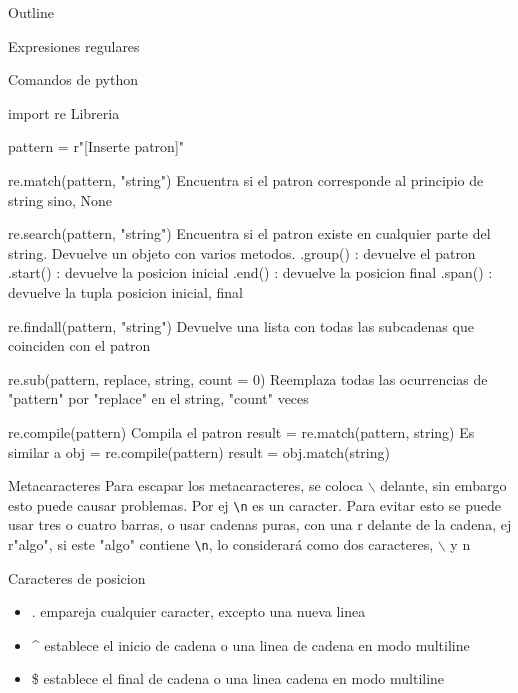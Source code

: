 \documentclass[presentation]{beamer}
\author{guillermo}
\date{\today}
\title{}
\begin{document}
\begin{frame}{Outline}
\tableofcontents
\end{frame}

\begin{frame}[label={sec:orgefa8e4e}]{Expresiones regulares}
\begin{block}{Comandos de python}
\begin{block}{import re}
Libreria
\end{block}
\begin{block}{pattern = r"[Inserte patron]"}
\end{block}
\begin{block}{re.match(pattern, "string")}
Encuentra si el patron corresponde al principio de string sino, None
\end{block}
\begin{block}{re.search(pattern, "string")}
Encuentra si el patron existe en cualquier parte del string. Devuelve un objeto con varios metodos.
.group() : devuelve el patron
.start() : devuelve la posicion inicial
.end()   : devuelve la posicion final
.span()  : devuelve la tupla posicion inicial, final
\end{block}
\begin{block}{re.findall(pattern, "string")}
Devuelve una lista con todas las subcadenas que coinciden con el patron
\end{block}
\begin{block}{re.sub(pattern, replace, string, count = 0)}
Reemplaza todas las ocurrencias de "pattern" por "replace" en el string, "count" veces
\end{block}

\begin{block}{re.compile(pattern)}
Compila el patron
	result = re.match(pattern, string)
Es similar a
	obj = re.compile(pattern)
	result = obj.match(string)
\end{block}
\end{block}
\begin{block}{Metacaracteres}
Para escapar los metacaracteres, se coloca $\backslash$ delante, sin embargo esto puede causar problemas. Por ej \verb|\n| es un caracter.
Para evitar esto se puede usar tres o cuatro barras, o usar cadenas puras, con una r delante de la cadena, ej r"algo", si este "algo" contiene \verb|\n|, lo considerará como dos caracteres, $\backslash$ y n
\begin{block}{Caracteres de posicion}
\begin{itemize}
\item .     empareja cualquier caracter, excepto una nueva linea
\item \^{}     establece el inicio de cadena o una linea de cadena en modo multiline
\item \$     establece el final de cadena o una linea cadena en modo multiline
\end{itemize}
\end{block}


\end{block}
\end{frame}
\end{document}
